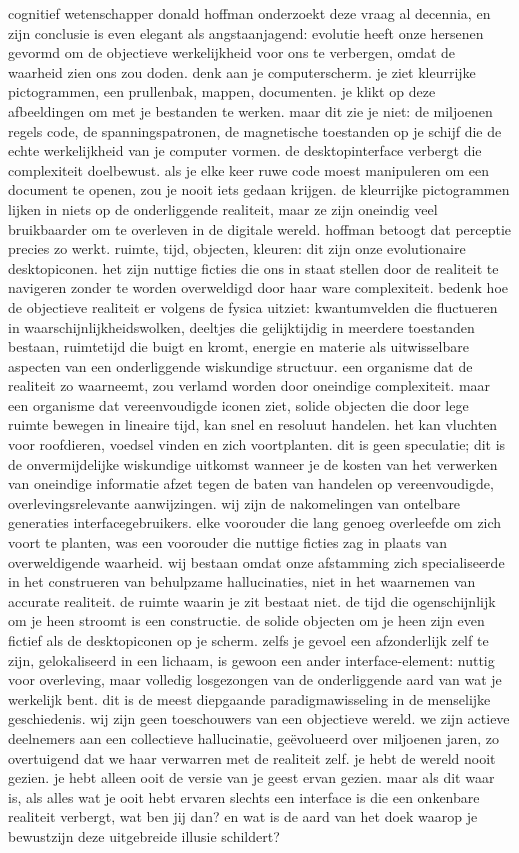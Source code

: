 cognitief wetenschapper donald hoffman onderzoekt deze vraag al decennia, en zijn conclusie is even elegant als angstaanjagend: evolutie heeft onze hersenen gevormd om de objectieve werkelijkheid voor ons te verbergen, omdat de waarheid zien ons zou doden. denk aan je computerscherm. je ziet kleurrijke pictogrammen, een prullenbak, mappen, documenten. je klikt op deze afbeeldingen om met je bestanden te werken. maar dit zie je niet: de miljoenen regels code, de spanningspatronen, de magnetische toestanden op je schijf die de echte werkelijkheid van je computer vormen. de desktopinterface verbergt die complexiteit doelbewust. als je elke keer ruwe code moest manipuleren om een document te openen, zou je nooit iets gedaan krijgen. de kleurrijke pictogrammen lijken in niets op de onderliggende realiteit, maar ze zijn oneindig veel bruikbaarder om te overleven in de digitale wereld. hoffman betoogt dat perceptie precies zo werkt. ruimte, tijd, objecten, kleuren: dit zijn onze evolutionaire desktopiconen. het zijn nuttige ficties die ons in staat stellen door de realiteit te navigeren zonder te worden overweldigd door haar ware complexiteit.
bedenk hoe de objectieve realiteit er volgens de fysica uitziet: kwantumvelden die fluctueren in waarschijnlijkheidswolken, deeltjes die gelijktijdig in meerdere toestanden bestaan, ruimtetijd die buigt en kromt, energie en materie als uitwisselbare aspecten van een onderliggende wiskundige structuur. een organisme dat de realiteit zo waarneemt, zou verlamd worden door oneindige complexiteit. maar een organisme dat vereenvoudigde iconen ziet, solide objecten die door lege ruimte bewegen in lineaire tijd, kan snel en resoluut handelen. het kan vluchten voor roofdieren, voedsel vinden en zich voortplanten. dit is geen speculatie; dit is de onvermijdelijke wiskundige uitkomst wanneer je de kosten van het verwerken van oneindige informatie afzet tegen de baten van handelen op vereenvoudigde, overlevingsrelevante aanwijzingen. wij zijn de nakomelingen van ontelbare generaties interfacegebruikers. elke voorouder die lang genoeg overleefde om zich voort te planten, was een voorouder die nuttige ficties zag in plaats van overweldigende waarheid. wij bestaan omdat onze afstamming zich specialiseerde in het construeren van behulpzame hallucinaties, niet in het waarnemen van accurate realiteit.
de ruimte waarin je zit bestaat niet. de tijd die ogenschijnlijk om je heen stroomt is een constructie. de solide objecten om je heen zijn even fictief als de desktopiconen op je scherm. zelfs je gevoel een afzonderlijk zelf te zijn, gelokaliseerd in een lichaam, is gewoon een ander interface-element: nuttig voor overleving, maar volledig losgezongen van de onderliggende aard van wat je werkelijk bent. dit is de meest diepgaande paradigmawisseling in de menselijke geschiedenis. wij zijn geen toeschouwers van een objectieve wereld. we zijn actieve deelnemers aan een collectieve hallucinatie, geëvolueerd over miljoenen jaren, zo overtuigend dat we haar verwarren met de realiteit zelf. je hebt de wereld nooit gezien. je hebt alleen ooit de versie van je geest ervan gezien. maar als dit waar is, als alles wat je ooit hebt ervaren slechts een interface is die een onkenbare realiteit verbergt, wat ben jij dan? en wat is de aard van het doek waarop je bewustzijn deze uitgebreide illusie schildert?
